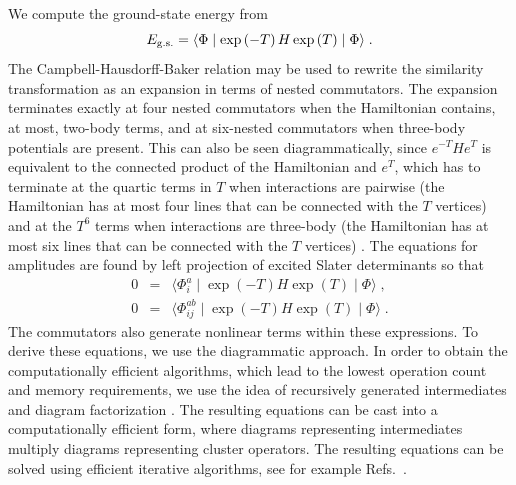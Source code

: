 \documentclass{ws-procs9x6}
\begin{document}
We compute the ground-state energy from
\begin{equation}
E_{\rm g.s.}=\langle\Phi\mid \exp\left(-T\right) H \exp\left(T\right)
\mid\Phi\rangle\;. 
\end{equation}
The Campbell-Hausdorff-Baker relation may be used to rewrite the similarity
transformation as an expansion in terms of nested commutators. 
The expansion terminates exactly at four nested commutators  when
the Hamiltonian contains, at most, two-body terms, and at six-nested 
commutators when  three-body potentials are present. 
This can also be seen diagrammatically, since $e^{-T} H e^{T}$ is
equivalent to the connected product of the Hamiltonian and $e^T$, which
has to terminate at the quartic terms in $T$ when interactions are
pairwise (the Hamiltonian has at most four lines that can be connected
with the $T$ vertices) and at the $T^{6}$ terms when interactions are
three-body (the Hamiltonian has at most six lines that can be connected
with the $T$ vertices) \cite{Paldus99,cizek66,cizek69}.
The equations for amplitudes are found by left projection of
excited Slater determinants
so that
\begin{eqnarray}
0 &=& \langle\Phi_i^a\mid 
\exp\left(-T\right) H \exp\left(T\right) \mid \Phi\rangle\;,  \nonumber \\ 
0 &=& \langle\Phi_{ij}^{ab}\mid 
\exp\left(-T\right) H \exp\left(T\right) \mid \Phi\rangle \;.
\label{project_eqns}
\end{eqnarray}
The commutators also generate nonlinear terms within these expressions. 
To derive these equations, we use the diagrammatic approach.
In order to obtain the computationally efficient algorithms,
which lead to the lowest operation count and memory requirements,
we use the idea of recursively generated intermediates and
diagram factorization \cite{Bartlett95}.
The resulting equations can be cast into a computationally
efficient form, where diagrams representing intermediates multiply
diagrams representing cluster operators. The resulting equations
can be solved using efficient iterative algorithms, see for example Refs.~\cite{ref1,Bartlett95}.
\end{document}
